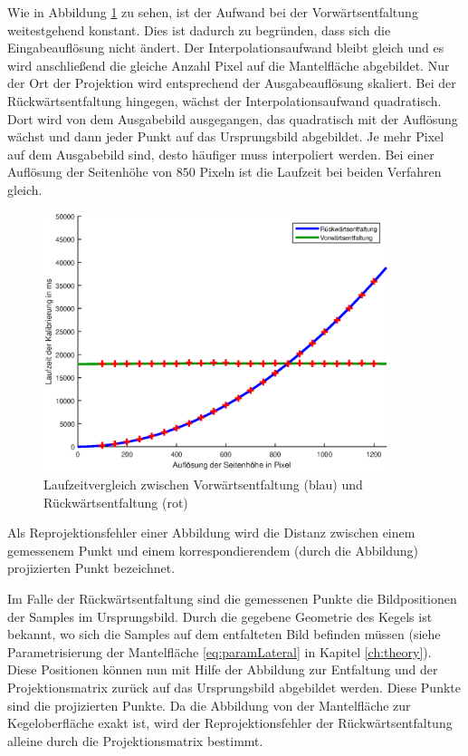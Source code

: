 Wie in Abbildung \ref{fig:runningTimeComparision} zu sehen, ist der Aufwand bei der Vorwärtsentfaltung weitestgehend konstant. Dies ist dadurch zu begründen, dass sich die Eingabeauflösung nicht ändert. Der Interpolationsaufwand bleibt gleich und es wird anschließend die gleiche Anzahl Pixel auf die Mantelfläche abgebildet. Nur der Ort der Projektion wird entsprechend der Ausgabeauflösung skaliert.
Bei der Rückwärtsentfaltung hingegen, wächst der Interpolationsaufwand quadratisch. Dort wird von dem Ausgabebild ausgegangen, das quadratisch mit der Auflösung wächst und dann jeder Punkt auf das Ursprungsbild abgebildet. Je mehr Pixel auf dem Ausgabebild sind, desto häufiger muss interpoliert werden. Bei einer Auflösung der Seitenhöhe von $850$ Pixeln ist die Laufzeit bei beiden Verfahren gleich.

\begin{figure}[!htb]
	\centering
	\includegraphics[width=0.9\textwidth]{images/runningTimeCalibration.eps}
	\caption[Laufzeitvergleich zwischen Vorwärtsentfaltung und Rückwärtsentfaltung]{Laufzeitvergleich zwischen Vorwärtsentfaltung (blau) und Rückwärtsentfaltung (rot)}
	\label{fig:runningTimeComparision}
\end{figure}


\bigskip

Als Reprojektionsfehler einer Abbildung wird die Distanz zwischen einem gemessenem Punkt und einem korrespondierendem (durch die Abbildung) projizierten Punkt bezeichnet.


Im Falle der Rückwärtsentfaltung sind die gemessenen Punkte die Bildpositionen der Samples im Ursprungsbild. Durch die gegebene Geometrie des Kegels ist bekannt, wo sich die Samples auf dem entfalteten Bild befinden müssen (siehe Parametrisierung der Mantelfläche \ref{eq:paramLateral} in Kapitel \ref{ch:theory}). Diese Positionen können nun mit Hilfe der Abbildung zur Entfaltung und der Projektionsmatrix zurück auf das Ursprungsbild abgebildet werden. Diese Punkte sind die projizierten Punkte. Da die Abbildung von der Mantelfläche zur Kegeloberfläche exakt ist, wird der Reprojektionsfehler der Rückwärtsentfaltung alleine durch die Projektionsmatrix bestimmt.

